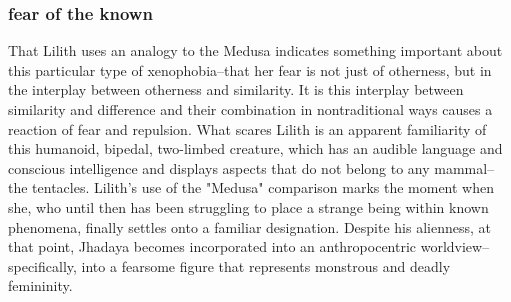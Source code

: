 \documentclass[11pt]{article}
\begin{document}
\subsubsection{fear of the known}
\label{sec:org2361fb9}
That Lilith uses an analogy to the Medusa indicates something
important about this particular type of xenophobia--that her fear is
not just of otherness, but in the interplay between otherness and
similarity. It is this interplay between similarity and difference and
their combination in nontraditional ways causes a reaction of fear and
repulsion. What scares Lilith is an apparent familiarity of this humanoid,
bipedal, two-limbed creature, which has an audible language and
conscious intelligence and displays aspects that do not belong to any
mammal--the tentacles. Lilith's use of the "Medusa" comparison marks
the moment when she, who until then has been struggling to place a
strange being within known phenomena, finally settles onto a familiar
designation. Despite his alienness, at that point, Jhadaya becomes
incorporated into an anthropocentric worldview--specifically, into a
fearsome figure that represents monstrous and deadly femininity.
\end{document}
